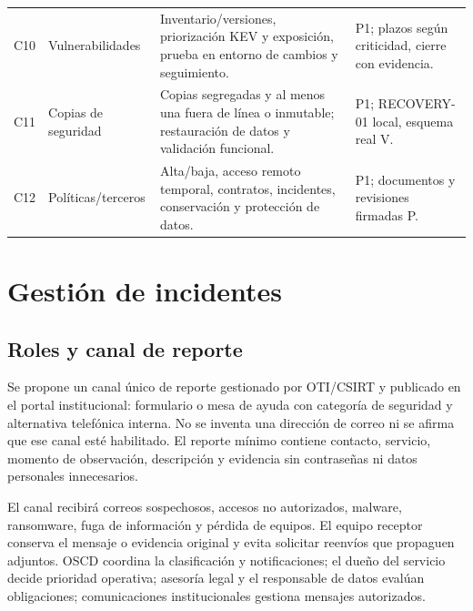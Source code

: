 \documentclass[10pt,a4paper]{article}
\begin{document}
\begin{TablaCompacta}
\begin{longtable}{P{18mm}P{31mm}P{68mm}P{42mm}}
C10 & Vulnerabilidades & Inventario/versiones, priorización KEV y exposición, prueba en entorno de cambios y seguimiento. & P1; plazos según criticidad, cierre con evidencia.\\
C11 & Copias de seguridad & Copias segregadas y al menos una fuera de línea o inmutable; restauración de datos y validación funcional. & P1; RECOVERY-01 local, esquema real V.\\
C12 & Políticas/terceros & Alta/baja, acceso remoto temporal, contratos, incidentes, conservación y protección de datos. & P1; documentos y revisiones firmadas P.\\\bottomrule
\end{longtable}
\end{TablaCompacta}

\section{Gestión de incidentes}
\subsection{Roles y canal de reporte}
Se propone un canal único de reporte gestionado por OTI/CSIRT y publicado en el portal institucional: formulario o mesa de ayuda con categoría de seguridad y alternativa telefónica interna. No se inventa una dirección de correo ni se afirma que ese canal esté habilitado. El reporte mínimo contiene contacto, servicio, momento de observación, descripción y evidencia sin contraseñas ni datos personales innecesarios.

El canal recibirá correos sospechosos, accesos no autorizados, malware, ransomware, fuga de información y pérdida de equipos. El equipo receptor conserva el mensaje o evidencia original y evita solicitar reenvíos que propaguen adjuntos. OSCD coordina la clasificación y notificaciones; el dueño del servicio decide prioridad operativa; asesoría legal y el responsable de datos evalúan obligaciones; comunicaciones institucionales gestiona mensajes autorizados.
\end{document}

